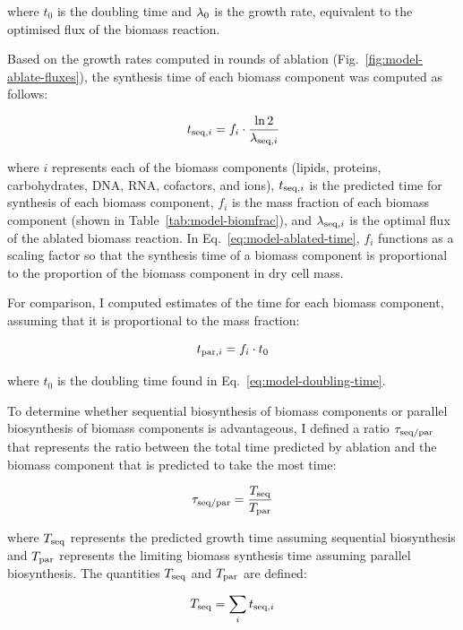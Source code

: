where $t_{0}$ is the doubling time and $\lambda_{0}$ is the growth rate, equivalent to the optimised flux of the biomass reaction.

Based on the growth rates computed in rounds of ablation (Fig.\ \ref{fig:model-ablate-fluxes}), the synthesis time of each biomass component was computed as follows:

\begin{equation}
  t_{\mathrm{seq},i} = f_{i} \cdot \frac{\ln 2}{\lambda_{\mathrm{seq},i}}
  \label{eq:model-ablated-time}
\end{equation}

where
$i$ represents each of the biomass components (lipids, proteins, carbohydrates, DNA, RNA, cofactors, and ions),
$t_{\mathrm{seq},i}$ is the predicted time for synthesis of each biomass component,
$f_{i}$ is the mass fraction of each biomass component (shown in Table~\ref{tab:model-biomfrac}), and
$\lambda_{\mathrm{seq},i}$ is the optimal flux of the ablated biomass reaction.
In Eq.\ \ref{eq:model-ablated-time}, $f_{i}$ functions as a scaling factor so that the synthesis time of a biomass component is proportional to the proportion of the biomass component in dry cell mass.

For comparison, I computed estimates of the time for each biomass component, assuming that it is proportional to the mass fraction:

\begin{equation}
  t_{\mathrm{par},i} = f_{i} \cdot t_{0}
  \label{eq:model-proportional-time}
\end{equation}

where $t_{0}$ is the doubling time found in Eq.\ \ref{eq:model-doubling-time}.

To determine whether sequential biosynthesis of biomass components or parallel biosynthesis of biomass components is advantageous, I defined a ratio $\tau_{\mathrm{seq}/\mathrm{par}}$ that represents the ratio between the total time predicted by ablation and the biomass component that is predicted to take the most time:

\begin{equation}
  \tau_{\mathrm{seq}/\mathrm{par}} = \frac{T_{\mathrm{seq}}}{T_{\mathrm{par}}}
  \label{eq:model-ratio-simplified}
\end{equation}

where $T_{\mathrm{seq}}$ represents the predicted growth time assuming sequential biosynthesis and $T_{\mathrm{par}}$ represents the limiting biomass synthesis time assuming parallel biosynthesis.
The quantities $T_{\mathrm{seq}}$ and $T_{\mathrm{par}}$ are defined:

\begin{equation}
  \Tseq = \sum_{i} \Tiabl %
  \label{eq:model-a}
\end{equation}

